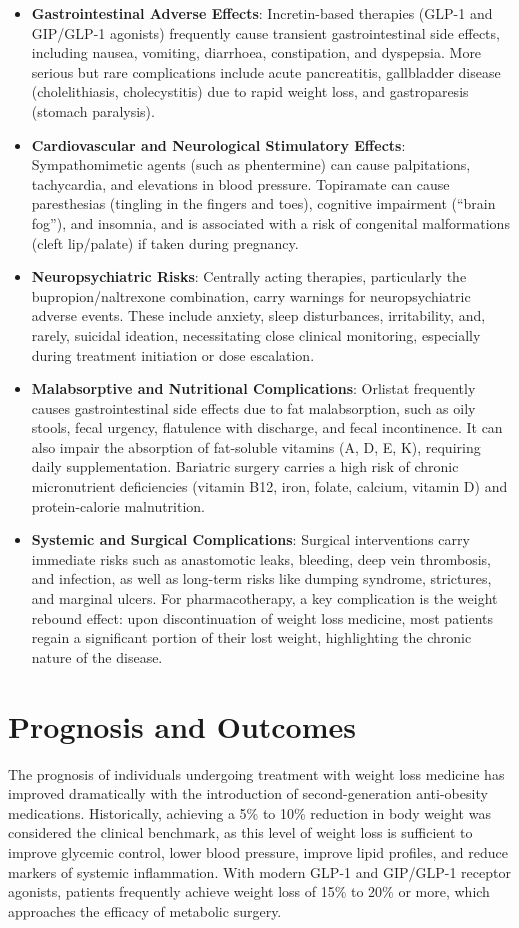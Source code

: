 \begin{itemize}
\item \textbf{Gastrointestinal Adverse Effects}: Incretin-based therapies (GLP-1 and GIP/GLP-1 agonists) frequently cause transient gastrointestinal side effects, including nausea, vomiting, diarrhoea, constipation, and dyspepsia. More serious but rare complications include acute pancreatitis, gallbladder disease (cholelithiasis, cholecystitis) due to rapid weight loss, and gastroparesis (stomach paralysis).
\item \textbf{Cardiovascular and Neurological Stimulatory Effects}: Sympathomimetic agents (such as phentermine) can cause palpitations, tachycardia, and elevations in blood pressure. Topiramate can cause paresthesias (tingling in the fingers and toes), cognitive impairment (``brain fog''), and insomnia, and is associated with a risk of congenital malformations (cleft lip/palate) if taken during pregnancy.
\item \textbf{Neuropsychiatric Risks}: Centrally acting therapies, particularly the bupropion/naltrexone combination, carry warnings for neuropsychiatric adverse events. These include anxiety, sleep disturbances, irritability, and, rarely, suicidal ideation, necessitating close clinical monitoring, especially during treatment initiation or dose escalation.
\item \textbf{Malabsorptive and Nutritional Complications}: Orlistat frequently causes gastrointestinal side effects due to fat malabsorption, such as oily stools, fecal urgency, flatulence with discharge, and fecal incontinence. It can also impair the absorption of fat-soluble vitamins (A, D, E, K), requiring daily supplementation. Bariatric surgery carries a high risk of chronic micronutrient deficiencies (vitamin B12, iron, folate, calcium, vitamin D) and protein-calorie malnutrition.
\item \textbf{Systemic and Surgical Complications}: Surgical interventions carry immediate risks such as anastomotic leaks, bleeding, deep vein thrombosis, and infection, as well as long-term risks like dumping syndrome, strictures, and marginal ulcers. For pharmacotherapy, a key complication is the weight rebound effect: upon discontinuation of weight loss medicine, most patients regain a significant portion of their lost weight, highlighting the chronic nature of the disease.
\end{itemize}

\section*{Prognosis and Outcomes}
The prognosis of individuals undergoing treatment with weight loss medicine has improved dramatically with the introduction of second-generation anti-obesity medications. Historically, achieving a 5\% to 10\% reduction in body weight was considered the clinical benchmark, as this level of weight loss is sufficient to improve glycemic control, lower blood pressure, improve lipid profiles, and reduce markers of systemic inflammation. With modern GLP-1 and GIP/GLP-1 receptor agonists, patients frequently achieve weight loss of 15\% to 20\% or more, which approaches the efficacy of metabolic surgery.

